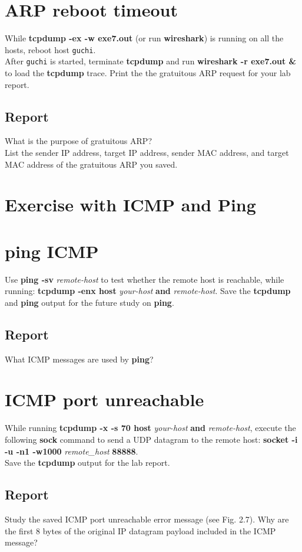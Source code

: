 \documentclass[10pt,a4paper]{article}
\numberwithin{equation}{section}
\numberwithin{figure}{section}
\numberwithin{table}{section}
\begin{document}
\section{ARP reboot timeout}
    While \textbf{tcpdump -ex -w exe7.out} (or run \textbf{wireshark}) is running on all the hosts, reboot host \texttt{guchi}. \\
    After \texttt{guchi} is started, terminate \textbf{tcpdump} and run \textbf{wireshark -r exe7.out \&} to load the \textbf{tcpdump} trace.
    Print the the gratuitous ARP request for your lab report.
    \subsection*{Report}
    What is the purpose of gratuitous ARP? \\
    List the sender IP address, target IP address, sender MAC address, and target MAC address of the gratuitous ARP you saved.


\section*{Exercise with ICMP and Ping}
\section{ping ICMP}
    Use \textbf{ping -sv} \textit{remote-host} to test whether the remote host is reachable, while running: \textbf{tcpdump -enx host} \textit{your-host} \textbf{and} \textit{remote-host}.
    Save the \textbf{tcpdump} and \textbf{ping} output for the future study on \textbf{ping}.
    \subsection*{Report}
    What ICMP messages are used by \textbf{ping}?

\section{ICMP port unreachable}
    While running \textbf{tcpdump -x -s 70 host} \textit{your-host} \textbf{and} \textit{remote-host}, execute the following \textbf{sock} command to send a UDP datagram to the remote host: \textbf{socket -i -u -n1 -w1000} \textit{remote\_host} \textbf{88888}. \\
    Save the \textbf{tcpdump} output for the lab report.
    \subsection*{Report}
    Study the saved ICMP port unreachable error message (see Fig. 2.7).
    Why are the first 8 bytes of the original IP datagram payload included in the ICMP message?
\end{document}
